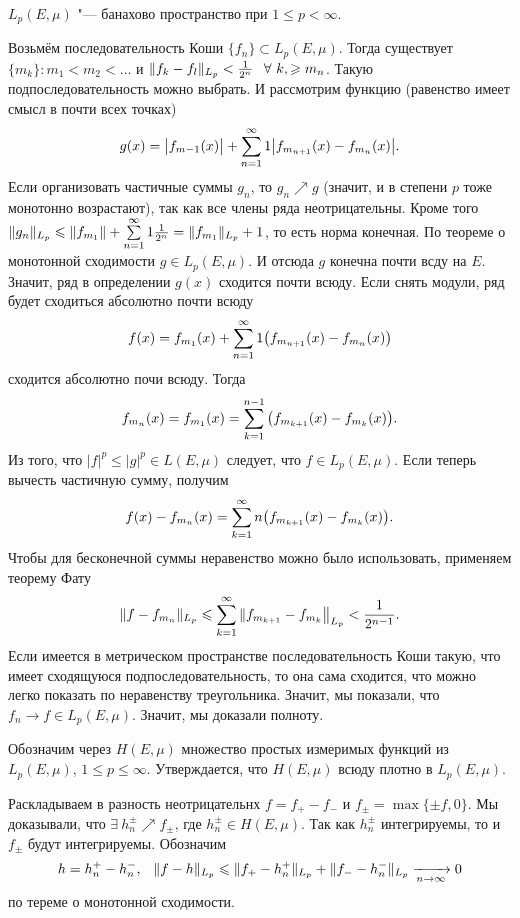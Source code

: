 \begin{The}
  $L_p(E,\mu)$ "--- банахово пространство при $1\le p<\infty$.
\end{The}
\begin{Proof}
  Возьмём последовательность Коши $\{f_n\}\subset L_p(E,\mu)$. Тогда существует $\{m_k\}\colon m_1<m_2<\dots$ и $\|f_k-f_l\|_{L_p}<\frac1{2^n}\pau \forall\ k,\ge m_n$. Такую подпоследовательность можно выбрать. И рассмотрим функцию (равенство имеет смысл в почти всех точках)
\[
  g(x) = \big|f_{m-1}(x)\big|+\sum\limits_{{n}={1}}^\infty1\big|f_{m_{n+1}}(x)-f_{m_n}(x)\big|.
\]
Если организовать частичные суммы $g_n$, то $g_n\nearrow g$ (значит, и в степени $p$ тоже монотонно возрастают), так как все члены ряда неотрицательны. Кроме того $\|g_n\|_{L_p}\leqslant \|f_{m_1}\|+\sum\limits_{{n}={1}}^\infty1\frac1{2^n} = \|f_{m_1}\|_{L_p}+1$, то есть норма конечная. По теореме о монотонной сходимости $g\in L_p(E,\mu)$. И отсюда $g$ конечна почти всду на $E$. Значит, ряд в определении $g(x)$ сходится почти всюду. Если снять модули, ряд будет сходиться абсолютно почти всюду
\[
  f(x) = f_{m_1}(x) + \sum\limits_{{n}={1}}^\infty1\big(f_{m_{n+1}}(x) - f_{m_n}(x)\big)
\]
сходится абсолютно почи всюду. Тогда
\[
  f_{m_n}(x) = f_{m_1}(x) = \sum\limits_{k = 1}^{n-1}\big(f_{m_{k+1}}(x) - f_{m_k}(x)\big).
\]
Из того, что $|f|^p\le |g|^p\in L(E,\mu)$ следует, что $f\in L_p(E,\mu)$. Если теперь вычесть частичную сумму, получим
\[
  f(x) - f_{m_n}(x) = \sum\limits_{{k}={1}}^\infty n\big(f_{m_{k+1}}(x) - f_{m_k}(x)\big).
\]
Чтобы для бесконечной суммы неравенство можно было использовать, применяем теорему Фату
\[
  \|f-f_{m_n}\|_{L_p}\leqslant \sum\limits_{k = 1}^{\infty}\|f_{m_{k+1}}-f_{m_k}\big\|_{L_p}<\frac1{2^{n-1}}.
\]
Если имеется в метрическом пространстве последовательность Коши такую, что имеет сходящуюся подпоследовательность, то она сама сходится, что можно легко показать по неравенству треугольника. Значит, мы показали, что $f_n\to f\in L_p(E,\mu)$. Значит, мы доказали полноту.
\end{Proof}

\begin{Lem}
  Обозначим через $H(E,\mu)$ множество простых измеримых функций из $L_p(E,\mu)$, $1\le p\le \infty$. Утверждается, что $H(E,\mu)$ всюду плотно в $L_p(E,\mu)$.
\end{Lem}
\begin{Proof}
  Раскладываем в разность неотрицательнх $f = f_+- f_-$ и $f_\pm = \max\{\pm f,0\}$. Мы доказывали, что $\exists\ h_n^\pm\nearrow f_\pm$, где $h_n^\pm\in H(E,\mu)$. Так как $h_n^\pm$ интегрируемы, то и $f_\pm$ будут интегрируемы. Обозначим
\[
  h = h_n^+ - h_n^-,\hskip .75em plus.1em minus.08em\relax \|f-h\|_{L_p}\leqslant \|f_+-h_n^+\|_{L_p}+\|f_--h_n^-\|_{L_p}\xrightarrow[n\rightarrow\infty]{}0
\]
по тереме о монотонной сходимости.
\end{Proof}

